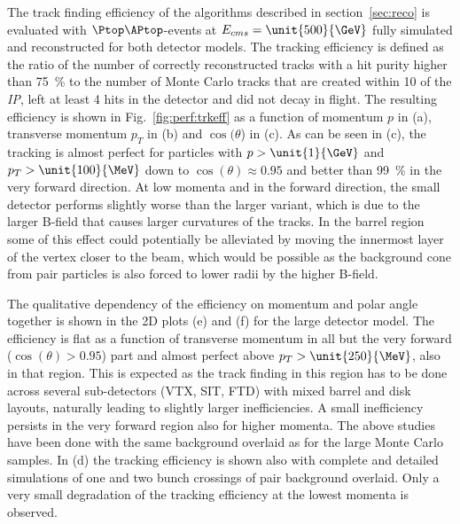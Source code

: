 The track finding efficiency of the algorithms described in section~\ref{sec:reco} is evaluated with $\Ptop\APtop$-events
at $E_{cms}=\unit{500}{\GeV}$ fully simulated and reconstructed for both detector models.
The tracking efficiency is defined as the ratio of the number of correctly reconstructed tracks with a hit purity higher than 75~\% to the
number of Monte Carlo tracks that are created within \unit{10}{\cm} of the {\em IP}, left at least 4 hits in the detector and
did not decay in flight. The resulting efficiency is shown in Fig.~\ref{fig:perf:trkeff} as a function of momentum $p$ in (a),
transverse momentum $p_T$ in (b) and $\cos(\theta$) in (c). As can be seen in (c), the tracking is almost perfect for particles
with $p>\unit{1}{\GeV}$ and $p_T>\unit{100}{\MeV}$ down to $\cos(\theta) \approx 0.95$ and better than 99~\% in the very forward
direction. At low momenta and in the forward direction, the small detector performs slightly worse than the larger variant, which
is due to the larger B-field that causes larger curvatures of the tracks. In the barrel region some of this effect could potentially
be alleviated by moving the innermost layer of the vertex closer to the beam, which would be possible as the background cone from
pair particles is also forced to lower radii by the higher B-field.

The qualitative dependency of the efficiency on momentum and polar angle together is shown in the 2D plots (e) and (f) for the large
detector model. The efficiency is flat as a function of transverse momentum in all but the very forward ($\cos(\theta)>0.95$)
part and almost perfect above $p_T>\unit{250}{\MeV}$, also in that region. This is expected as the track finding in this region has to be done
across several sub-detectors (VTX, SIT, FTD) with mixed barrel and disk layouts, naturally leading to slightly larger inefficiencies.
A small inefficiency persists in the very forward region also for higher momenta.
The above studies have been done with the same background overlaid as for the large Monte Carlo samples.
In (d) the tracking efficiency is shown also with complete and detailed simulations of one and two bunch crossings of pair
background overlaid. Only a very small degradation of the tracking efficiency at the lowest momenta is observed.

